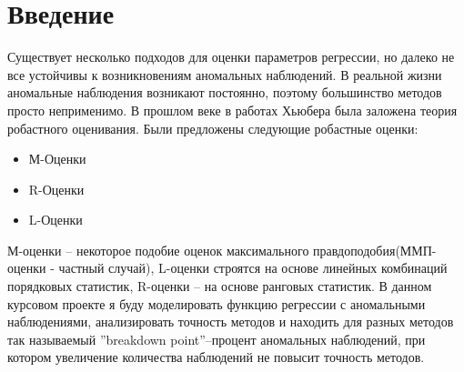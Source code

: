\documentclass[12pt]{article}
\begin{document}
\section{Введение}
Существует несколько подходов для оценки параметров регрессии, но далеко не все устойчивы к возникновениям аномальных наблюдений.
В реальной жизни аномальные наблюдения возникают постоянно, поэтому большинство методов просто неприменимо.
В прошлом веке в работах Хьюбера была заложена теория робастного оценивания.\hfill\break
Были предложены следующие робастные оценки\cite{Huber}:\hfill\break
\begin{itemize}
    \item М-Оценки\\
    \item R-Оценки\\
    \item L-Оценки
\end{itemize}
М-оценки -- некоторое подобие оценок максимального правдоподобия(ММП-оценки - частный случай), L-оценки строятся на основе линейных комбинаций порядковых статистик, R-оценки -- на основе ранговых статистик.
В данном курсовом проекте я буду моделировать функцию регрессии с аномальными наблюдениями, анализировать точность методов и находить для разных методов так называемый ''breakdown point''--процент аномальных наблюдений, при котором увеличение количества наблюдений не повысит точность методов.

\newpage
\end{document}
